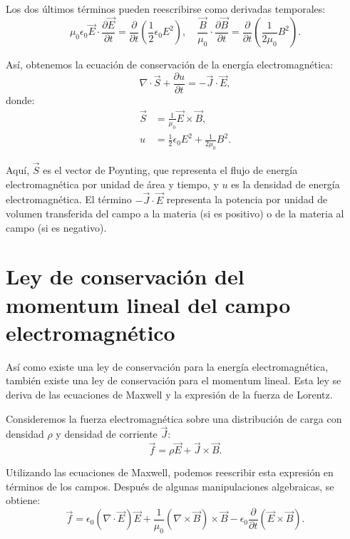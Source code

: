 \documentclass[12pt,a4paper]{book}
\begin{document}
Los dos últimos términos pueden reescribirse como derivadas temporales:
\begin{equation}
\mu_0 \epsilon_0 \vec{E} \cdot \frac{\partial \vec{E}}{\partial t} = \frac{\partial}{\partial t}\left(\frac{1}{2}\epsilon_0 E^2\right), \quad \frac{\vec{B}}{\mu_0} \cdot \frac{\partial \vec{B}}{\partial t} = \frac{\partial}{\partial t}\left(\frac{1}{2\mu_0}B^2\right).
\end{equation}

Así, obtenemos la ecuación de conservación de la energía electromagnética:
\begin{equation}
\nabla \cdot \vec{S} + \frac{\partial u}{\partial t} = -\vec{J} \cdot \vec{E},
\end{equation}
donde:
\begin{align}
\vec{S} &= \frac{1}{\mu_0}\vec{E} \times \vec{B}, \\
u &= \frac{1}{2}\epsilon_0 E^2 + \frac{1}{2\mu_0}B^2.
\end{align}

Aquí, $\vec{S}$ es el vector de Poynting, que representa el flujo de energía electromagnética por unidad de área y tiempo, y $u$ es la densidad de energía electromagnética. El término $-\vec{J} \cdot \vec{E}$ representa la potencia por unidad de volumen transferida del campo a la materia (si es positivo) o de la materia al campo (si es negativo).
\section{Ley de conservación del momentum lineal del campo electromagnético}

Así como existe una ley de conservación para la energía electromagnética, también existe una ley de conservación para el momentum lineal. Esta ley se deriva de las ecuaciones de Maxwell y la expresión de la fuerza de Lorentz.

Consideremos la fuerza electromagnética sobre una distribución de carga con densidad $\rho$ y densidad de corriente $\vec{J}$:
\begin{equation}
\vec{f} = \rho \vec{E} + \vec{J} \times \vec{B}.
\end{equation}

Utilizando las ecuaciones de Maxwell, podemos reescribir esta expresión en términos de los campos. Después de algunas manipulaciones algebraicas, se obtiene:
\begin{equation}
\vec{f} = \epsilon_0 (\nabla \cdot \vec{E})\vec{E} + \frac{1}{\mu_0}(\nabla \times \vec{B}) \times \vec{B} - \epsilon_0 \frac{\partial}{\partial t}(\vec{E} \times \vec{B}).
\end{equation}
\end{document}
